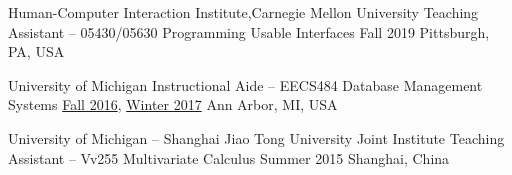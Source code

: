 
\begin{cvteachingexps}

  \cvteachingexp
    {Human-Computer Interaction Institute,Carnegie Mellon University} %
    {Teaching Assistant – 05430/05630 Programming Usable Interfaces} %
    {Fall 2019} %
    {Pittsburgh, PA, USA} %
    

  \cvteachingexp
    {University of Michigan} %
    {Instructional Aide – EECS484 Database Management Systems} %
    {\href{http://web.eecs.umich.edu/~aprakash/eecs484/index.html}{Fall 2016}, \href{http://web.eecs.umich.edu/~mozafari/eecs484/}{Winter 2017}} %
    {Ann Arbor, MI, USA} %

  \cvteachingexp
    {University of Michigan – Shanghai Jiao Tong University Joint Institute} %
    {Teaching Assistant – Vv255 Multivariate Calculus} %
    {Summer 2015} %
    {Shanghai, China} %

\end{cvteachingexps}